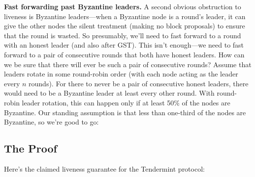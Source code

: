 \noindent
\textbf{Fast forwarding past Byzantine leaders.} 
A second obvious obstruction to liveness is
Byzantine leaders—when a Byzantine node is a round’s leader, it can give the other nodes
the silent treatment (making no block proposals) to ensure that the round is wasted. So
presumably, we’ll need to fast forward to a round with an honest leader (and also after GST).
This isn't enough—we need to fast forward to a pair of consecutive rounds that both
have honest leaders. How can we be sure that there will ever be such a pair of consecutive
rounds? Assume that leaders rotate in some round-robin order (with each node acting as
the leader every $n$ rounds). For there to never be a pair of consecutive honest leaders, there
would need to be a Byzantine leader at least every other round. With round-robin leader
rotation, this can happen only if at least 50\% of the nodes are Byzantine. Our standing
assumption is that less than one-third of the nodes are Byzantine, so we’re good to go:



 \subsection{The Proof}
Here’s the claimed liveness guarantee for the Tendermint protocol:

